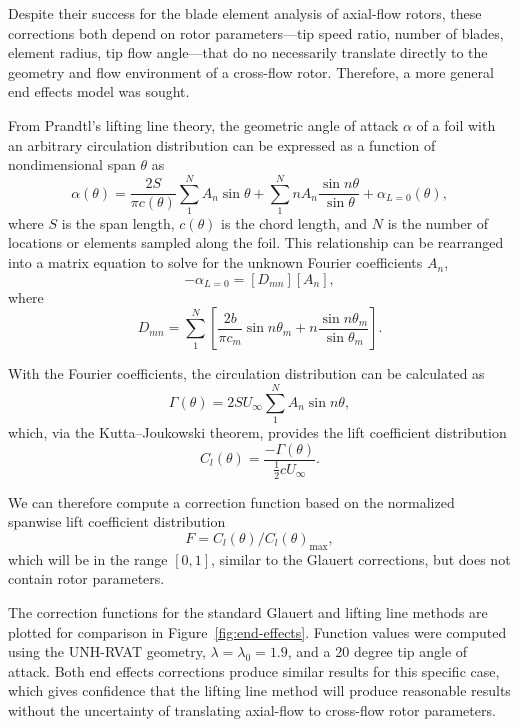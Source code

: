 Despite their success for the blade element analysis of axial-flow rotors, these
corrections both depend on rotor parameters---tip speed ratio, number of blades,
element radius, tip flow angle---that do no necessarily translate directly to
the geometry and flow environment of a cross-flow rotor. Therefore, a more
general end effects model was sought.

From Prandtl's lifting line theory, the geometric angle of attack $\alpha$ of a
foil with an arbitrary circulation distribution can be expressed as a function
of nondimensional span $\theta$ as \cite{Anderson2001}
\begin{equation}
    \alpha (\theta) = \frac{2S}{\pi c (\theta)}
    \sum_1^N A_n \sin \theta
    + \sum_1^N n A_n \frac{\sin n \theta}{\sin \theta}
    + \alpha_{L = 0}(\theta),
    \label{eq:lifting-line}
\end{equation}
where $S$ is the span length, $c(\theta)$ is the chord length, and $N$ is the
number of locations or elements sampled along the foil. This relationship can be
rearranged into a matrix equation to solve for the unknown Fourier coefficients
$A_n$,
\begin{equation}
    [\alpha_m ] - \alpha_{L=0} = [D_{mn}][A_n],
\end{equation}
where
\begin{equation}
    D_{mn} = \sum_1^N \left[ \frac{2b}{\pi c_m} \sin n \theta_m + n \frac{\sin n
        \theta_m}{\sin \theta_m} \right].
\end{equation}

With the Fourier coefficients, the circulation distribution can be calculated as
\begin{equation}
    \Gamma (\theta) = 2SU_\infty \sum_1^N A_n \sin n \theta,
\end{equation}
which, via the Kutta--Joukowski theorem, provides the lift coefficient
distribution
\begin{equation}
    C_l(\theta) = \frac{-\Gamma (\theta)}{\frac{1}{2} c U_\infty}.
\end{equation}

We can therefore compute a correction function based on the normalized spanwise
lift coefficient distribution
\begin{equation}
    F = C_l(\theta)/C_l(\theta)_{\max},
\end{equation}
which will be in the range $[0, 1]$, similar to the Glauert corrections, but
does not contain rotor parameters. 

The correction functions for the standard Glauert and lifting line methods are
plotted for comparison in Figure~\ref{fig:end-effects}. Function values were
computed using the UNH-RVAT geometry, $\lambda = \lambda_0 = 1.9$, and a 20
degree tip angle of attack. Both end effects corrections produce similar results
for this specific case, which gives confidence that the lifting line method will
produce reasonable results without the uncertainty of translating axial-flow to
cross-flow rotor parameters.

